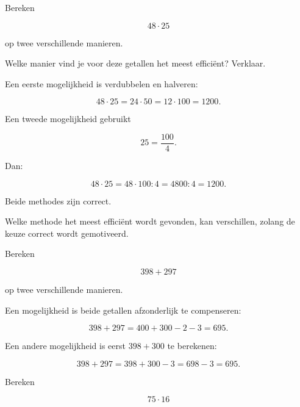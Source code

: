 \documentclass{ximera}
\begin{document}
\begin{oefening}{\oefG}

\begin{question}

Bereken

\[
48\cdot25
\]

op twee verschillende manieren.

Welke manier vind je voor deze getallen het meest efficiënt? Verklaar.

\begin{oplossing}

Een eerste mogelijkheid is verdubbelen en halveren:

\[
48\cdot25
=
24\cdot50
=
12\cdot100
=
1200.
\]

Een tweede mogelijkheid gebruikt

\[
25=\frac{100}{4}.
\]

Dan:

\[
48\cdot25
=
48\cdot100:4
=
4800:4
=
1200.
\]

Beide methodes zijn correct.

Welke methode het meest efficiënt wordt gevonden, kan verschillen, zolang
de keuze correct wordt gemotiveerd.

\end{oplossing}

\end{question}


\begin{question}

Bereken

\[
398+297
\]

op twee verschillende manieren.

\begin{oplossing}

Een mogelijkheid is beide getallen afzonderlijk te compenseren:

\[
398+297
=
400+300-2-3
=
695.
\]

Een andere mogelijkheid is eerst \(398+300\) te berekenen:

\[
398+297
=
398+300-3
=
698-3
=
695.
\]

\end{oplossing}

\end{question}


\begin{question}

Bereken

\[
75\cdot16
\]


\end{question}
\end{oefening}
\end{document}
